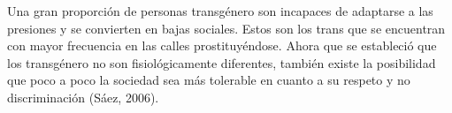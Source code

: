 Una gran proporción de personas transgénero son incapaces de adaptarse a las
presiones y se convierten en bajas sociales. Estos son los trans que se
encuentran con mayor frecuencia en las calles prostituyéndose. Ahora que se
estableció que los transgénero no son fisiológicamente diferentes, también
existe la posibilidad que poco a poco la sociedad sea más tolerable en cuanto a
su respeto y no discriminación (Sáez, 2006).
